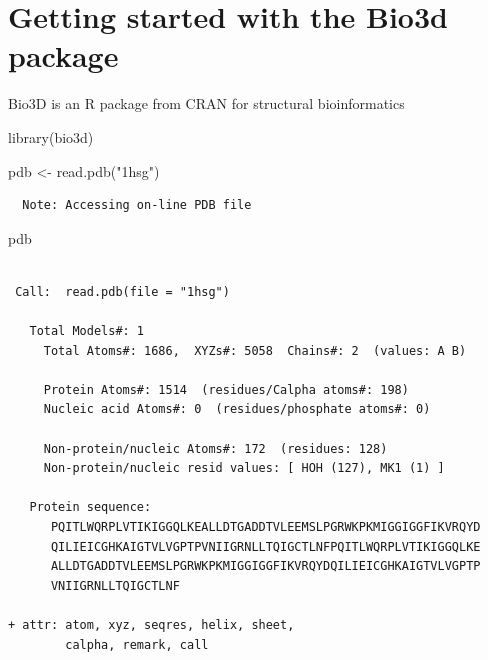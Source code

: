 \documentclass[
  letterpaper,
  DIV=11,
  numbers=noendperiod]{scrartcl}
\newenvironment{Shaded}{\begin{snugshade}}{\end{snugshade}}
\newcommand{\DecValTok}[1]{\textcolor[rgb]{0.68,0.00,0.00}{#1}}
\newcommand{\FunctionTok}[1]{\textcolor[rgb]{0.28,0.35,0.67}{#1}}
\newcommand{\NormalTok}[1]{\textcolor[rgb]{0.00,0.23,0.31}{#1}}
\newcommand{\OtherTok}[1]{\textcolor[rgb]{0.00,0.23,0.31}{#1}}
\newcommand{\SpecialCharTok}[1]{\textcolor[rgb]{0.37,0.37,0.37}{#1}}
\newcommand{\StringTok}[1]{\textcolor[rgb]{0.13,0.47,0.30}{#1}}
\begin{document}
\section{Getting started with the Bio3d
package}\label{getting-started-with-the-bio3d-package}

Bio3D is an R package from CRAN for structural bioinformatics

\begin{Shaded}
\begin{Highlighting}[]
\FunctionTok{library}\NormalTok{(bio3d)}

\NormalTok{pdb }\OtherTok{\textless{}{-}} \FunctionTok{read.pdb}\NormalTok{(}\StringTok{"1hsg"}\NormalTok{)}
\end{Highlighting}
\end{Shaded}

\begin{verbatim}
  Note: Accessing on-line PDB file
\end{verbatim}

\begin{Shaded}
\begin{Highlighting}[]
\NormalTok{pdb}
\end{Highlighting}
\end{Shaded}

\begin{verbatim}

 Call:  read.pdb(file = "1hsg")

   Total Models#: 1
     Total Atoms#: 1686,  XYZs#: 5058  Chains#: 2  (values: A B)

     Protein Atoms#: 1514  (residues/Calpha atoms#: 198)
     Nucleic acid Atoms#: 0  (residues/phosphate atoms#: 0)

     Non-protein/nucleic Atoms#: 172  (residues: 128)
     Non-protein/nucleic resid values: [ HOH (127), MK1 (1) ]

   Protein sequence:
      PQITLWQRPLVTIKIGGQLKEALLDTGADDTVLEEMSLPGRWKPKMIGGIGGFIKVRQYD
      QILIEICGHKAIGTVLVGPTPVNIIGRNLLTQIGCTLNFPQITLWQRPLVTIKIGGQLKE
      ALLDTGADDTVLEEMSLPGRWKPKMIGGIGGFIKVRQYDQILIEICGHKAIGTVLVGPTP
      VNIIGRNLLTQIGCTLNF

+ attr: atom, xyz, seqres, helix, sheet,
        calpha, remark, call
\end{verbatim}

\begin{Shaded}
\end{Shaded}
\end{document}
